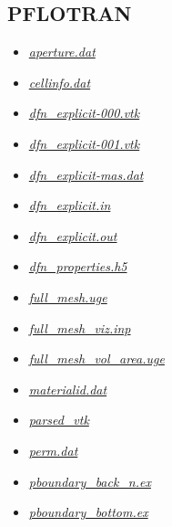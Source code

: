 \documentclass[letterpaper,10pt,english]{sphinxmanual}
\begin{document}
\subsection{PFLOTRAN}
\label{output:pflotran}\begin{itemize}
\item {} 
{\hyperref[output:aperture-dat]{\emph{aperture.dat}}}

\item {} 
{\hyperref[output:cellinfo-dat]{\emph{cellinfo.dat}}}

\item {} 
{\hyperref[output:dfn-explicit-000-vtk]{\emph{dfn\_explicit-000.vtk}}}

\item {} 
{\hyperref[output:dfn-explicit-001-vtk]{\emph{dfn\_explicit-001.vtk}}}

\item {} 
{\hyperref[output:dfn-explicit-mas-dat]{\emph{dfn\_explicit-mas.dat}}}

\item {} 
{\hyperref[output:dfn-explicit-in]{\emph{dfn\_explicit.in}}}

\item {} 
{\hyperref[output:dfn-explicit-out]{\emph{dfn\_explicit.out}}}

\item {} 
{\hyperref[output:dfn-properties-h5]{\emph{dfn\_properties.h5}}}

\item {} 
{\hyperref[output:full-mesh-uge]{\emph{full\_mesh.uge}}}

\item {} 
{\hyperref[output:full-mesh-viz-inp]{\emph{full\_mesh\_viz.inp}}}

\item {} 
{\hyperref[output:full-mesh-vol-area-uge]{\emph{full\_mesh\_vol\_area.uge}}}

\item {} 
{\hyperref[output:materialid-dat]{\emph{materialid.dat}}}

\item {} 
{\hyperref[output:parsed-vtk]{\emph{parsed\_vtk}}}

\item {} 
{\hyperref[output:perm-dat]{\emph{perm.dat}}}

\item {} 
{\hyperref[output:pboundary-back-n-ex]{\emph{pboundary\_back\_n.ex}}}

\item {} 
{\hyperref[output:pboundary-bottom-ex]{\emph{pboundary\_bottom.ex}}}


\end{itemize}
\end{document}
